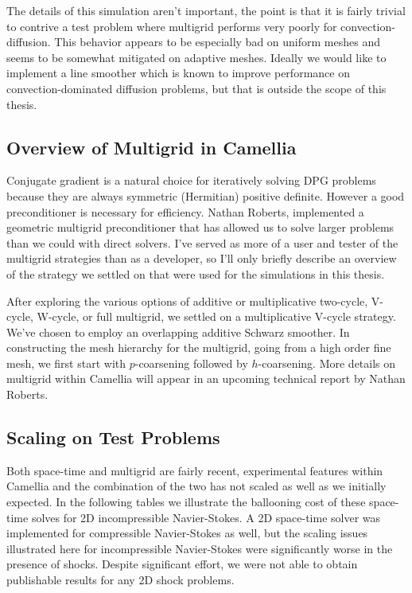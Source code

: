 \documentclass[Dissertation.tex]{subfiles}
\begin{document}
The details of this simulation aren't important, the point is that it is fairly trivial to contrive a 
test problem where multigrid performs very poorly for convection-diffusion.
This behavior appears to be especially bad on uniform meshes and seems to be somewhat mitigated on adaptive meshes.
Ideally we would like to implement a line smoother which is known to improve performance 
on convection-dominated diffusion problems, but that is outside the scope of this thesis.

\subsection{Overview of Multigrid in Camellia}
Conjugate gradient is a natural choice for iteratively solving DPG problems because they are always symmetric
(Hermitian) positive definite.
However a good preconditioner is necessary for efficiency.
Nathan Roberts, implemented a geometric multigrid preconditioner
that has allowed us to solve larger problems than we could with direct solvers.
I've served as more of a user and tester of the multigrid strategies than as a developer, so
I'll only briefly describe an overview of the strategy we settled on 
that were used for the simulations in this thesis.

After exploring the various options of additive or multiplicative two-cycle, V-cycle, W-cycle, or full multigrid,
we settled on a multiplicative V-cycle strategy.
We've chosen to employ an overlapping additive Schwarz smoother.
In constructing the mesh hierarchy for the multigrid, going from a high order fine mesh, we first start
with $p$-coarsening followed by $h$-coarsening.
More details on multigrid within Camellia will appear in an upcoming technical report by Nathan Roberts.

\subsection{Scaling on Test Problems}
Both space-time and multigrid are fairly recent, experimental features within Camellia
and the combination of the two has not scaled as well as we initially expected. 
In the following tables we illustrate the ballooning cost of these space-time solves 
for 2D incompressible Navier-Stokes.
A 2D space-time solver was implemented for compressible Navier-Stokes as well, but the 
scaling issues illustrated here for incompressible Navier-Stokes were significantly worse
in the presence of shocks. 
Despite significant effort, we were not able to obtain publishable results for any 2D shock problems.
\end{document}
